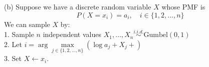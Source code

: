 \begin{homeworkProblem}
(b) Suppose we have a discrete random variable $X$ whose PMF is
$$P(X = x_i) = a_i,\quad i \in \{1,2,\ldots,n\}$$
We can sample $X$ by: \\
1. Sample $n$ independent values $X_1,\ldots,X_n \stackrel{i.i.d.}{\sim} \text{Gumbel}(0,1)$ \\
2. Let $i = \arg\max\limits_{j \in \{1,2,\dots,n\}} \left( \log a_j + X_j + \right)$ \\
3. Set $X \gets x_i$.

\end{homeworkProblem}

\newpage